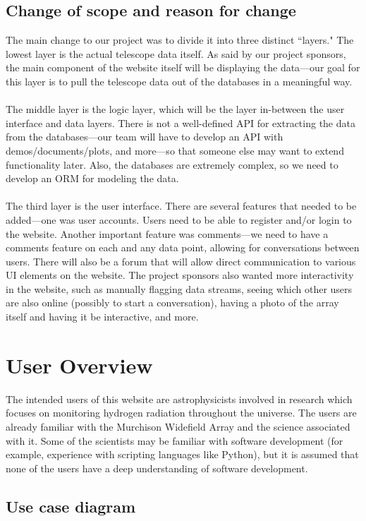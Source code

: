 \documentclass[12pt]{article}
\begin{document}
\begin{spacing}{1.5}
\subsection{Change of scope and reason for change}
The main change to our project was to divide it into three distinct ``layers." 
The lowest layer is the actual telescope data itself. As said by our project sponsors, the main component of the website itself will be displaying the data---our goal for this layer is to pull the telescope data out of the databases in a meaningful way.
\\ \\
The middle layer is the logic layer, which will be the layer in-between the user interface and data layers. There is not a well-defined API for extracting the data from the databases---our team will have to develop an API with demos/documents/plots, and more---so that someone else may want to extend functionality later. Also, the databases are extremely complex, so we need to develop an ORM for modeling the data. 
\\ \\
The third layer is the user interface. There are several features that needed to be added---one was user accounts. Users need to be able to register and/or login to the website. Another important feature was comments---we need to have a comments feature on each and any data point, allowing for conversations between users. There will also be a forum that will allow direct communication to various UI elements on the website. The project sponsors also wanted more interactivity in the website, such as manually flagging data streams, seeing which other users are also online (possibly to start a conversation), having a photo of the array itself and having it be interactive, and more. 

\section{User Overview}
The intended users of this website are astrophysicists involved in research which focuses on monitoring hydrogen radiation throughout the universe. The users are already familiar with the Murchison Widefield Array and the science associated with it. Some of the scientists may be familiar with software development (for example, experience with scripting languages like Python), but it is assumed that none of the users have a deep understanding of software development.

\subsection{Use case diagram}

\end{spacing}
\end{document}
